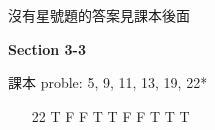 \documentclass[12pt]{article}
\begin{document}
\begin{center}
沒有星號題的答案見課本後面
\end{center}



\textbf{Section 3-3} 
 
課本 proble: 5, 9, 11, 13, 19, 22*

\begin{enumerate}
\item[22] T F F T T F F T T T
\end{enumerate}
\end{document}
